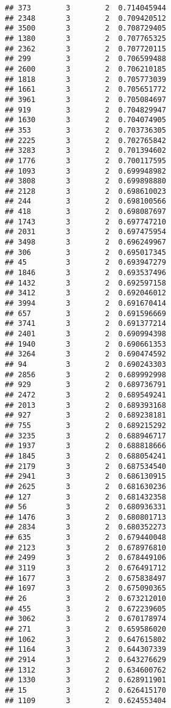 \documentclass[
]{article}
\begin{document}
\begin{verbatim}
## 373        3        2  0.714045944
## 2348       3        2  0.709420512
## 3500       3        2  0.708729405
## 1380       3        2  0.707765325
## 2362       3        2  0.707720115
## 299        3        2  0.706599488
## 2600       3        2  0.706210185
## 1818       3        2  0.705773039
## 1661       3        2  0.705651772
## 3961       3        2  0.705084697
## 919        3        2  0.704829947
## 1630       3        2  0.704074905
## 353        3        2  0.703736305
## 2225       3        2  0.702765842
## 3283       3        2  0.701394602
## 1776       3        2  0.700117595
## 1093       3        2  0.699948982
## 3808       3        2  0.699898880
## 2128       3        2  0.698610023
## 244        3        2  0.698100566
## 418        3        2  0.698087697
## 1743       3        2  0.697747210
## 2031       3        2  0.697475954
## 3498       3        2  0.696249967
## 306        3        2  0.695017345
## 45         3        2  0.693947279
## 1846       3        2  0.693537496
## 1432       3        2  0.692597158
## 3412       3        2  0.692046012
## 3994       3        2  0.691670414
## 657        3        2  0.691596669
## 3741       3        2  0.691377214
## 2401       3        2  0.690994398
## 1940       3        2  0.690661353
## 3264       3        2  0.690474592
## 94         3        2  0.690243303
## 2856       3        2  0.689992998
## 929        3        2  0.689736791
## 2472       3        2  0.689549241
## 2013       3        2  0.689393168
## 927        3        2  0.689238181
## 755        3        2  0.689215292
## 3235       3        2  0.688946717
## 1937       3        2  0.688818666
## 1845       3        2  0.688054241
## 2179       3        2  0.687534540
## 2941       3        2  0.686130915
## 2625       3        2  0.681630236
## 127        3        2  0.681432358
## 56         3        2  0.680936331
## 1476       3        2  0.680801713
## 2834       3        2  0.680352273
## 635        3        2  0.679440048
## 2123       3        2  0.678976810
## 2499       3        2  0.678449106
## 3119       3        2  0.676491712
## 1677       3        2  0.675838497
## 1697       3        2  0.675090365
## 26         3        2  0.673212010
## 455        3        2  0.672239605
## 3062       3        2  0.670178974
## 271        3        2  0.659586020
## 1062       3        2  0.647615802
## 1164       3        2  0.644307339
## 2914       3        2  0.643276629
## 1312       3        2  0.634600762
## 1330       3        2  0.628911901
## 15         3        2  0.626415170
## 1109       3        2  0.624553404

\end{verbatim}
\end{document}
